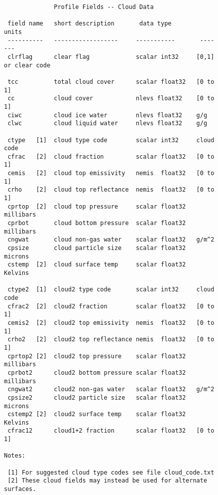 \documentclass[11pt]{article}
\begin{document}
\begin{figure}
{\footnotesize
\begin{verbatim}
              Profile Fields -- Cloud Data
  
 field name   short description       data type         units
 ----------   ------------------     -----------       -------
 clrflag      clear flag             scalar int32     [0,1] or clear code

 tcc          total cloud cover      scalar float32   [0 to 1]
 cc           cloud cover            nlevs float32    [0 to 1]
 ciwc         cloud ice water        nlevs float32    g/g 
 clwc         cloud liquid water     nlevs float32    g/g 

 ctype   [1]  cloud type code        scalar int32     cloud code
 cfrac   [2]  cloud fraction         scalar float32   [0 to 1]
 cemis   [2]  cloud top emissivity   nemis  float32   [0 to 1]
 crho    [2]  cloud top reflectance  nemis  float32   [0 to 1]
 cprtop  [2]  cloud top pressure     scalar float32   millibars
 cprbot       cloud bottom pressure  scalar float32   millibars
 cngwat       cloud non-gas water    scalar float32   g/m^2
 cpsize       cloud particle size    scalar float32   microns
 cstemp  [2]  cloud surface temp     scalar float32   Kelvins

 ctype2  [1]  cloud2 type code       scalar int32     cloud code
 cfrac2  [2]  cloud2 fraction        scalar float32   [0 to 1]
 cemis2  [2]  cloud2 top emissivity  nemis  float32   [0 to 1]
 crho2   [2]  cloud2 top reflectance nemis  float32   [0 to 1]
 cprtop2 [2]  cloud2 top pressure    scalar float32   millibars
 cprbot2      cloud2 bottom pressure scalar float32   millibars
 cngwat2      cloud2 non-gas water   scalar float32   g/m^2
 cpsize2      cloud2 particle size   scalar float32   microns
 cstemp2 [2]  cloud2 surface temp    scalar float32   Kelvins
 cfrac12      cloud1+2 fraction      scalar float32   [0 to 1]

Notes:

 [1] For suggested cloud type codes see file cloud_code.txt
 [2] These cloud fields may instead be used for alternate surfaces.
    
\end{verbatim}
}
\end{figure}
\end{document}
